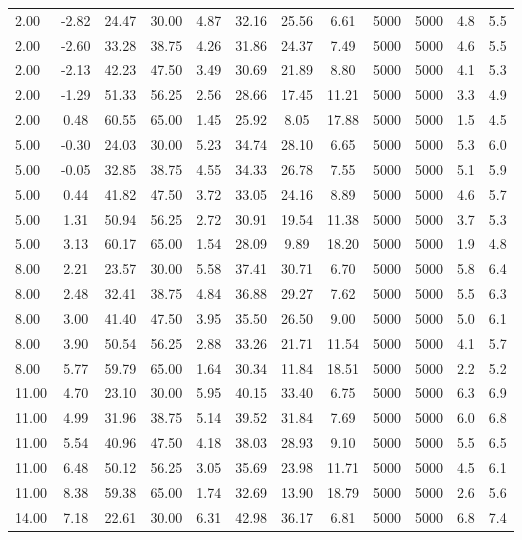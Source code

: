 \documentclass[english]{SPFShortReport}
\begin{document}
\begin{table}[!ht]
\begin{small}
\begin{center}
{\begin{tabular}{l | c c c c c c c c c c c }
2.00 & -2.82 & 24.47 & 30.00 & 4.87 & 32.16 & 25.56 & 6.61 & 5000 & 5000 & 4.8 & 5.5\\ 
2.00 & -2.60 & 33.28 & 38.75 & 4.26 & 31.86 & 24.37 & 7.49 & 5000 & 5000 & 4.6 & 5.5\\ 
2.00 & -2.13 & 42.23 & 47.50 & 3.49 & 30.69 & 21.89 & 8.80 & 5000 & 5000 & 4.1 & 5.3\\ 
2.00 & -1.29 & 51.33 & 56.25 & 2.56 & 28.66 & 17.45 & 11.21 & 5000 & 5000 & 3.3 & 4.9\\ 
2.00 & 0.48 & 60.55 & 65.00 & 1.45 & 25.92 & 8.05 & 17.88 & 5000 & 5000 & 1.5 & 4.5\\ 
5.00 & -0.30 & 24.03 & 30.00 & 5.23 & 34.74 & 28.10 & 6.65 & 5000 & 5000 & 5.3 & 6.0\\ 
5.00 & -0.05 & 32.85 & 38.75 & 4.55 & 34.33 & 26.78 & 7.55 & 5000 & 5000 & 5.1 & 5.9\\ 
5.00 & 0.44 & 41.82 & 47.50 & 3.72 & 33.05 & 24.16 & 8.89 & 5000 & 5000 & 4.6 & 5.7\\ 
5.00 & 1.31 & 50.94 & 56.25 & 2.72 & 30.91 & 19.54 & 11.38 & 5000 & 5000 & 3.7 & 5.3\\ 
5.00 & 3.13 & 60.17 & 65.00 & 1.54 & 28.09 & 9.89 & 18.20 & 5000 & 5000 & 1.9 & 4.8\\ 
8.00 & 2.21 & 23.57 & 30.00 & 5.58 & 37.41 & 30.71 & 6.70 & 5000 & 5000 & 5.8 & 6.4\\ 
8.00 & 2.48 & 32.41 & 38.75 & 4.84 & 36.88 & 29.27 & 7.62 & 5000 & 5000 & 5.5 & 6.3\\ 
8.00 & 3.00 & 41.40 & 47.50 & 3.95 & 35.50 & 26.50 & 9.00 & 5000 & 5000 & 5.0 & 6.1\\ 
8.00 & 3.90 & 50.54 & 56.25 & 2.88 & 33.26 & 21.71 & 11.54 & 5000 & 5000 & 4.1 & 5.7\\ 
8.00 & 5.77 & 59.79 & 65.00 & 1.64 & 30.34 & 11.84 & 18.51 & 5000 & 5000 & 2.2 & 5.2\\ 
11.00 & 4.70 & 23.10 & 30.00 & 5.95 & 40.15 & 33.40 & 6.75 & 5000 & 5000 & 6.3 & 6.9\\ 
11.00 & 4.99 & 31.96 & 38.75 & 5.14 & 39.52 & 31.84 & 7.69 & 5000 & 5000 & 6.0 & 6.8\\ 
11.00 & 5.54 & 40.96 & 47.50 & 4.18 & 38.03 & 28.93 & 9.10 & 5000 & 5000 & 5.5 & 6.5\\ 
11.00 & 6.48 & 50.12 & 56.25 & 3.05 & 35.69 & 23.98 & 11.71 & 5000 & 5000 & 4.5 & 6.1\\ 
11.00 & 8.38 & 59.38 & 65.00 & 1.74 & 32.69 & 13.90 & 18.79 & 5000 & 5000 & 2.6 & 5.6\\ 
14.00 & 7.18 & 22.61 & 30.00 & 6.31 & 42.98 & 36.17 & 6.81 & 5000 & 5000 & 6.8 & 7.4\\ 

\end{tabular}}
\end{center}
\end{small}
\end{table}
\end{document}
